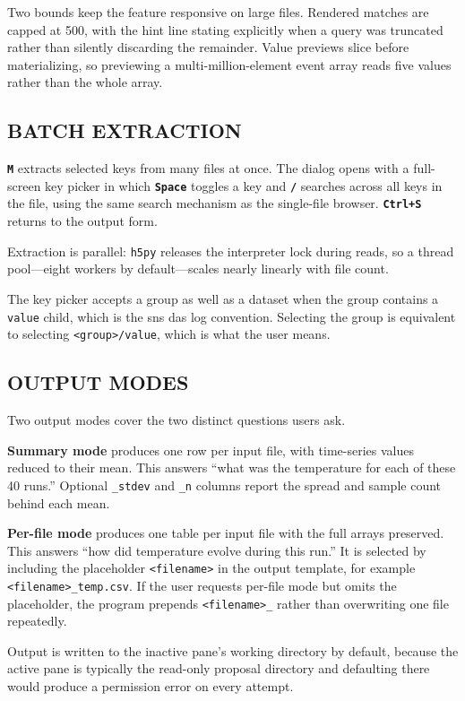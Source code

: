 \documentclass[tm]{ornltm}
\newcommand{\key}[1]{\textbf{\texttt{#1}}}
\begin{document}
Two bounds keep the feature responsive on large files. Rendered matches are
capped at 500, with the hint line stating explicitly when a query was truncated
rather than silently discarding the remainder. Value previews slice before
materializing, so previewing a multi-million-element event array reads five
values rather than the whole array.

\subsection{BATCH EXTRACTION}

\key{M} extracts selected keys from many files at once. The dialog opens with a
full-screen key picker in which \key{Space} toggles a key and \key{/} searches
across all keys in the file, using the same search mechanism as the single-file
browser. \key{Ctrl+S} returns to the output form.

Extraction is parallel: \texttt{h5py} releases the interpreter lock during reads,
so a thread pool---eight workers by default---scales nearly linearly with file
count.

The key picker accepts a group as well as a dataset when the group contains a
\texttt{value} child, which is the \ac{sns} \ac{das} log convention. Selecting the
group is equivalent to selecting \texttt{<group>/value}, which is what the user
means.

\subsection{OUTPUT MODES}

Two output modes cover the two distinct questions users ask.

\textbf{Summary mode} produces one row per input file, with time-series values
reduced to their mean. This answers ``what was the temperature for each of these
40 runs.'' Optional \texttt{\_stdev} and \texttt{\_n} columns report the spread
and sample count behind each mean.

\textbf{Per-file mode} produces one table per input file with the full arrays
preserved. This answers ``how did temperature evolve during this run.'' It is
selected by including the placeholder \texttt{<filename>} in the output template,
for example \texttt{<filename>\_temp.csv}. If the user requests per-file mode but
omits the placeholder, the program prepends \texttt{<filename>\_} rather than
overwriting one file repeatedly.

Output is written to the inactive pane's working directory by default, because
the active pane is typically the read-only proposal directory and defaulting
there would produce a permission error on every attempt.
\end{document}

